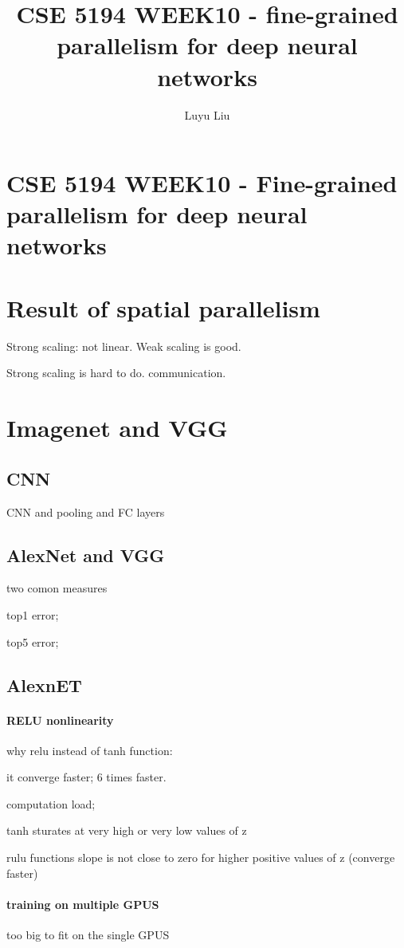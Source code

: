 \documentclass[12pt]{article}
\begin{document}
\author{Luyu Liu}

\newcommand\para{\par\refstepcounter{para}\thepara\space}

\section*{CSE 5194 WEEK10 - Fine-grained parallelism for deep neural networks}
\title{CSE 5194 WEEK10 - fine-grained parallelism for deep neural networks}
\section{Result of spatial parallelism}
Strong scaling: not linear.
Weak scaling is good.

Strong scaling is hard to do. communication.

\section{Imagenet and VGG}

\subsection{CNN}
CNN and pooling and FC layers

\subsection{AlexNet and VGG}
two comon measures

top1 error;

top5 error;

\subsection{AlexnET}
\paragraph{RELU nonlinearity}
why relu instead of tanh function:

it converge faster; 6 times faster.

computation load;

tanh sturates at very high or very low values of z

rulu functions slope is not close to zero for higher positive values of z
(converge faster)

\paragraph{training on multiple GPUS}
too big to fit on the single GPUS
\end{document}
